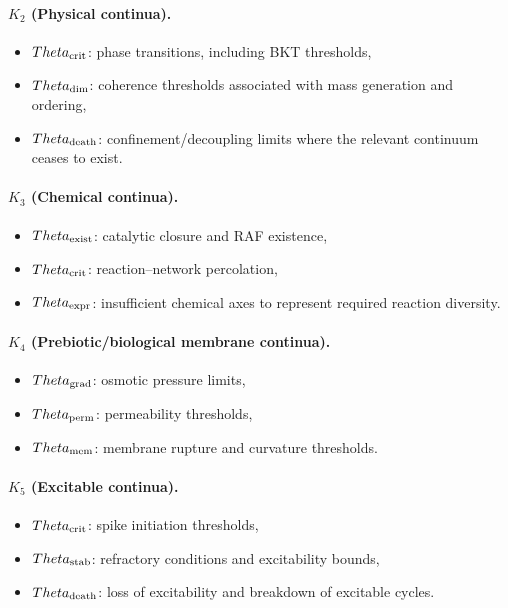 \paragraph{\texorpdfstring{\(K_2\)}{K_2} (Physical continua).}
\begin{itemize}
    \item \(\Theta_{\rm crit}\): phase transitions, including BKT thresholds,
    \item \(\Theta_{\rm dim}\): coherence thresholds associated with
          mass generation and ordering,
    \item \(\Theta_{\rm death}\): confinement/decoupling limits where
          the relevant continuum ceases to exist.
\end{itemize}

\paragraph{\texorpdfstring{\(K_3\)}{K_3} (Chemical continua).}
\begin{itemize}
    \item \(\Theta_{\rm exist}\): catalytic closure and RAF existence,
    \item \(\Theta_{\rm crit}\): reaction–network percolation,
    \item \(\Theta_{\rm expr}\): insufficient chemical axes to represent
          required reaction diversity.
\end{itemize}

\paragraph{\texorpdfstring{\(K_4\)}{K_4} (Prebiotic/biological membrane continua).}
\begin{itemize}
    \item \(\Theta_{\rm grad}\): osmotic pressure limits,
    \item \(\Theta_{\rm perm}\): permeability thresholds,
    \item \(\Theta_{\rm mem}\): membrane rupture and curvature thresholds.
\end{itemize}

\paragraph{\texorpdfstring{\(K_5\)}{K_5} (Excitable continua).}
\begin{itemize}
    \item \(\Theta_{\rm crit}\): spike initiation thresholds,
    \item \(\Theta_{\rm stab}\): refractory conditions and excitability bounds,
    \item \(\Theta_{\rm death}\): loss of excitability and breakdown of
          excitable cycles.
\end{itemize}

